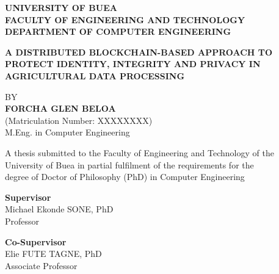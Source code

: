 \documentclass[12pt,a4paper,oneside]{book}
\begin{document}
\frontmatter
\pagestyle{fancy}

\thispagestyle{empty}
\begin{center}
\begin{singlespace}

{\fontsize{14}{17}\selectfont\bfseries UNIVERSITY OF BUEA}\\[0.4\baselineskip]
{\fontsize{14}{17}\selectfont\bfseries FACULTY OF ENGINEERING AND TECHNOLOGY}\\[0.3\baselineskip]
{\fontsize{14}{17}\selectfont\bfseries DEPARTMENT OF COMPUTER ENGINEERING}

\vspace{2.5\baselineskip}

{\fontsize{16}{19}\selectfont\bfseries
A DISTRIBUTED BLOCKCHAIN-BASED APPROACH TO PROTECT IDENTITY,
INTEGRITY AND PRIVACY IN AGRICULTURAL DATA PROCESSING}

\vspace{2.5\baselineskip}

{\fontsize{14}{17}\selectfont BY}\\[0.4\baselineskip]
{\fontsize{14}{17}\selectfont\bfseries FORCHA GLEN BELOA}\\[0.3\baselineskip]
{\fontsize{12}{14}\selectfont (Matriculation Number: XXXXXXXX)}\\
{\fontsize{12}{14}\selectfont M.Eng. in Computer Engineering}

\vspace{2\baselineskip}

{\fontsize{12}{14}\selectfont
A thesis submitted to the Faculty of Engineering and Technology of the\\
University of Buea in partial fulfilment of the requirements for the\\
degree of Doctor of Philosophy (PhD) in Computer Engineering}

\vspace{2.5\baselineskip}

{\fontsize{14}{17}\selectfont\bfseries Supervisor}\\[0.3\baselineskip]
{\fontsize{12}{14}\selectfont Michael Ekonde SONE, PhD\\ Professor}

\vspace{1.2\baselineskip}

{\fontsize{14}{17}\selectfont\bfseries Co-Supervisor}\\[0.3\baselineskip]
{\fontsize{12}{14}\selectfont Elie FUTE TAGNE, PhD\\ Associate Professor}

\vfill

{\fontsize{14}{17}\selectfont\bfseries \monthyear}

\end{singlespace}
\end{center}
\clearpage
 
\end{document}
